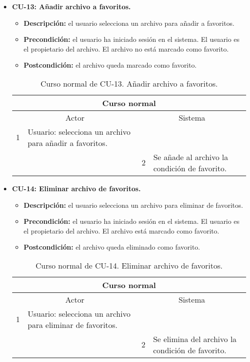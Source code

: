 \begin{itemize}
	\item \textbf{CU-13: Añadir archivo a favoritos.}
	\begin{itemize}
		\item \textbf{Descripción:} el usuario selecciona un archivo para añadir a favoritos.
		\item \textbf{Precondición:} el usuario ha iniciado sesión en el sistema. El usuario es el propietario del archivo. El archivo no está marcado como favorito.
		\item \textbf{Postcondición:} el archivo queda marcado como favorito.
	\end{itemize}
	\begin{table}[H]
		\centering
		\begin{tabular}{|p{0.3cm}|p{5cm}|p{0.3cm}|p{5cm}|}
			\hline
			\multicolumn{4}{|c|}{Curso normal} \\ \hline
			\multicolumn{2}{|c|}{Actor} & \multicolumn{2}{|c|}{Sistema} \\ \hline
			1 & Usuario: selecciona un archivo para añadir a favoritos. &  &  \\ \hline
			&  & 2 & Se añade al archivo la condición de favorito. \\ \hline
		\end{tabular}
		\caption{Curso normal de CU-13. Añadir archivo a favoritos.}
		\label{tabla:cu13-normal}
	\end{table}
\end{itemize}

\begin{itemize}
	\item \textbf{CU-14: Eliminar archivo de favoritos.}
	\begin{itemize}
		\item \textbf{Descripción:} el usuario selecciona un archivo para eliminar de favoritos.
		\item \textbf{Precondición:} el usuario ha iniciado sesión en el sistema. El usuario es el propietario del archivo. El archivo está marcado como favorito.
		\item \textbf{Postcondición:} el archivo queda eliminado como favorito.
	\end{itemize}
	\begin{table}[H]
		\centering
		\begin{tabular}{|p{0.3cm}|p{5cm}|p{0.3cm}|p{5cm}|}
			\hline
			\multicolumn{4}{|c|}{Curso normal} \\ \hline
			\multicolumn{2}{|c|}{Actor} & \multicolumn{2}{|c|}{Sistema} \\ \hline
			1 & Usuario: selecciona un archivo para eliminar de favoritos. &  &  \\ \hline
			&  & 2 & Se elimina del archivo la condición de favorito. \\ \hline
		\end{tabular}
		\caption{Curso normal de CU-14. Eliminar archivo de favoritos.}
		\label{tabla:cu14-normal}
	\end{table}
\end{itemize}


